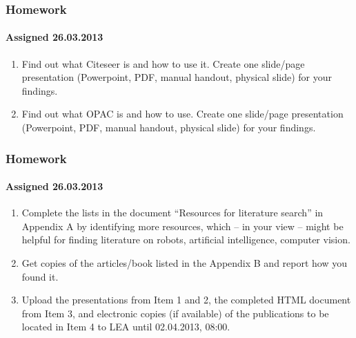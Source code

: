 \begin{frame}
    \frametitle{Homework}
    \framesubtitle{Assigned 26.03.2013}
	\begin{enumerate}
		\item Find out what Citeseer is and how to use it. Create one slide/page presentation (Powerpoint, PDF, manual handout, physical slide) for your findings.
		\item Find out what OPAC is and how to use. Create one slide/page presentation (Powerpoint, PDF, manual handout, physical slide) for your findings.
		\end{enumerate}
\end{frame}
\begin{frame}
    \frametitle{Homework}
    \framesubtitle{Assigned 26.03.2013}
	\begin{enumerate}
		\addtocounter{enumi}{2}
		\item Complete the lists in the document “Resources for literature search” in Appendix A by identifying more resources, which – in your view – might be helpful for finding literature on robots, artificial intelligence, computer vision.
		\item Get copies of the articles/book listed in the Appendix B and report how you found it.
		\item Upload the presentations from Item 1 and 2, the completed HTML document from Item 3, and electronic copies (if available) of the publications to be located in Item 4 to LEA until 02.04.2013, 08:00.
	\end{enumerate}
\end{frame}
	